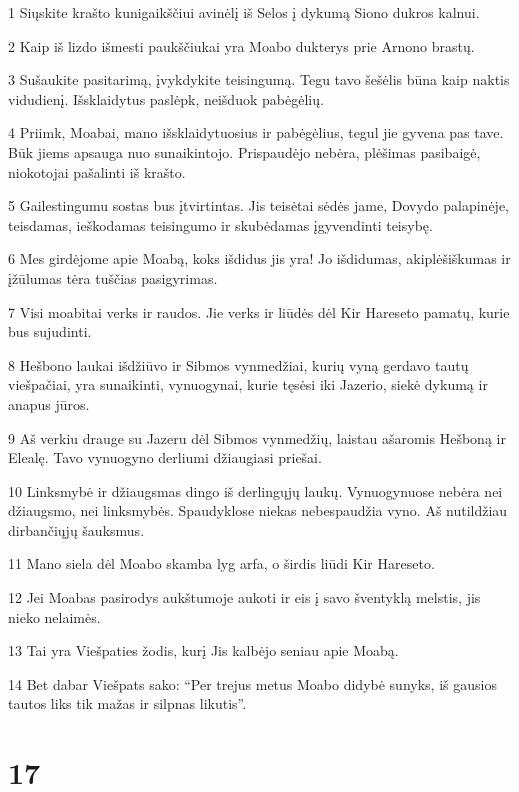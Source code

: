 \par 1 Siųskite krašto kunigaikščiui avinėlį iš Selos į dykumą Siono dukros kalnui. 
\par 2 Kaip iš lizdo išmesti paukščiukai yra Moabo dukterys prie Arnono brastų. 
\par 3 Sušaukite pasitarimą, įvykdykite teisingumą. Tegu tavo šešėlis būna kaip naktis vidudienį. Išsklaidytus paslėpk, neišduok pabėgėlių. 
\par 4 Priimk, Moabai, mano išsklaidytuosius ir pabėgėlius, tegul jie gyvena pas tave. Būk jiems apsauga nuo sunaikintojo. Prispaudėjo nebėra, plėšimas pasibaigė, niokotojai pašalinti iš krašto. 
\par 5 Gailestingumu sostas bus įtvirtintas. Jis teisėtai sėdės jame, Dovydo palapinėje, teisdamas, ieškodamas teisingumo ir skubėdamas įgyvendinti teisybę. 
\par 6 Mes girdėjome apie Moabą, koks išdidus jis yra! Jo išdidumas, akiplėšiškumas ir įžūlumas tėra tuščias pasigyrimas. 
\par 7 Visi moabitai verks ir raudos. Jie verks ir liūdės dėl Kir Hareseto pamatų, kurie bus sujudinti. 
\par 8 Hešbono laukai išdžiūvo ir Sibmos vynmedžiai, kurių vyną gerdavo tautų viešpačiai, yra sunaikinti, vynuogynai, kurie tęsėsi iki Jazerio, siekė dykumą ir anapus jūros. 
\par 9 Aš verkiu drauge su Jazeru dėl Sibmos vynmedžių, laistau ašaromis Hešboną ir Elealę. Tavo vynuogyno derliumi džiaugiasi priešai. 
\par 10 Linksmybė ir džiaugsmas dingo iš derlingųjų laukų. Vynuogynuose nebėra nei džiaugsmo, nei linksmybės. Spaudyklose niekas nebespaudžia vyno. Aš nutildžiau dirbančiųjų šauksmus. 
\par 11 Mano siela dėl Moabo skamba lyg arfa, o širdis liūdi Kir Hareseto. 
\par 12 Jei Moabas pasirodys aukštumoje aukoti ir eis į savo šventyklą melstis, jis nieko nelaimės. 
\par 13 Tai yra Viešpaties žodis, kurį Jis kalbėjo seniau apie Moabą. 
\par 14 Bet dabar Viešpats sako: “Per trejus metus Moabo didybė sunyks, iš gausios tautos liks tik mažas ir silpnas likutis”.



\chapter{17}

